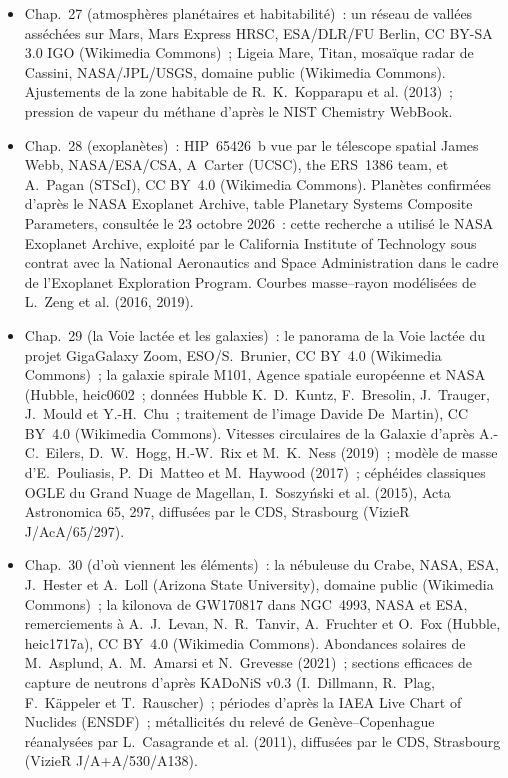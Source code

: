 \begin{itemize}
  \item Chap.~27 (atmosphères planétaires et habitabilité)~: un réseau de vallées asséchées sur Mars, Mars Express HRSC, ESA/DLR/FU Berlin, CC BY-SA 3.0 IGO (Wikimedia Commons)~; Ligeia Mare, Titan, mosaïque radar de Cassini, NASA/JPL/USGS, domaine public (Wikimedia Commons). Ajustements de la zone habitable de R.~K.~Kopparapu et al. (2013)~; pression de vapeur du méthane d'après le NIST Chemistry WebBook.
  \item Chap.~28 (exoplanètes)~: HIP~65426~b vue par le télescope spatial James Webb, NASA/ESA/CSA, A~Carter (UCSC), the ERS~1386 team, et A.~Pagan (STScI), CC BY~4.0 (Wikimedia Commons). Planètes confirmées d'après le NASA Exoplanet Archive, table Planetary Systems Composite Parameters, consultée le 23 octobre 2026~: cette recherche a utilisé le NASA Exoplanet Archive, exploité par le California Institute of Technology sous contrat avec la National Aeronautics and Space Administration dans le cadre de l'Exoplanet Exploration Program. Courbes masse--rayon modélisées de L.~Zeng et al. (2016, 2019).
  \item Chap.~29 (la Voie lactée et les galaxies)~: le panorama de la Voie lactée du projet GigaGalaxy Zoom, ESO/S.~Brunier, CC BY~4.0 (Wikimedia Commons)~; la galaxie spirale M101, Agence spatiale européenne et NASA (Hubble, heic0602~; données Hubble K.~D.~Kuntz, F.~Bresolin, J.~Trauger, J.~Mould et Y.-H.~Chu~; traitement de l'image Davide De~Martin), CC BY~4.0 (Wikimedia Commons). Vitesses circulaires de la Galaxie d'après A.-C.~Eilers, D.~W.~Hogg, H.-W.~Rix et M.~K.~Ness (2019)~; modèle de masse d'E.~Pouliasis, P.~Di~Matteo et M.~Haywood (2017)~; céphéides classiques OGLE du Grand Nuage de Magellan, I.~Soszy\'nski et al. (2015), Acta Astronomica 65, 297, diffusées par le CDS, Strasbourg (VizieR J/AcA/65/297).
  \item Chap.~30 (d'où viennent les éléments)~: la nébuleuse du Crabe, NASA, ESA, J.~Hester et A.~Loll (Arizona State University), domaine public (Wikimedia Commons)~; la kilonova de GW170817 dans NGC~4993, NASA et ESA, remerciements à A.~J.~Levan, N.~R.~Tanvir, A.~Fruchter et O.~Fox (Hubble, heic1717a), CC BY~4.0 (Wikimedia Commons). Abondances solaires de M.~Asplund, A.~M.~Amarsi et N.~Grevesse (2021)~; sections efficaces de capture de neutrons d'après KADoNiS v0.3 (I.~Dillmann, R.~Plag, F.~K\"appeler et T.~Rauscher)~; périodes d'après la IAEA Live Chart of Nuclides (ENSDF)~; métallicités du relevé de Genève--Copenhague réanalysées par L.~Casagrande et al. (2011), diffusées par le CDS, Strasbourg (VizieR J/A+A/530/A138).
\end{itemize}
